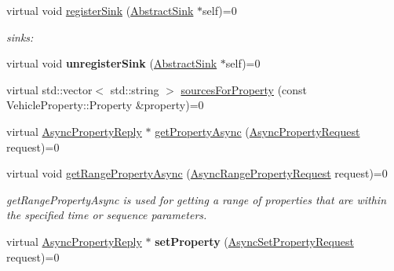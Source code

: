 \begin{DoxyCompactItemize}
\item 
\hypertarget{classAbstractRoutingEngine_a179052d9ab3f70ddb4c91421f94c45a9}{virtual void \hyperlink{classAbstractRoutingEngine_a179052d9ab3f70ddb4c91421f94c45a9}{register\+Sink} (\hyperlink{classAbstractSink}{Abstract\+Sink} $\ast$self)=0}\label{classAbstractRoutingEngine_a179052d9ab3f70ddb4c91421f94c45a9}

\begin{DoxyCompactList}\small\item\em sinks\+: \end{DoxyCompactList}\item 
\hypertarget{classAbstractRoutingEngine_a0f0a96c938c395565d01e0f78cc3bea8}{virtual void {\bfseries unregister\+Sink} (\hyperlink{classAbstractSink}{Abstract\+Sink} $\ast$self)=0}\label{classAbstractRoutingEngine_a0f0a96c938c395565d01e0f78cc3bea8}

\item 
virtual std\+::vector$<$ std\+::string $>$ \hyperlink{classAbstractRoutingEngine_aef8ad3a6c8d00d7fe9fdb378acf918c0}{sources\+For\+Property} (const Vehicle\+Property\+::\+Property \&property)=0
\item 
virtual \hyperlink{classAsyncPropertyReply}{Async\+Property\+Reply} $\ast$ \hyperlink{classAbstractRoutingEngine_ad1cbda415f674be4a3ce49be05aa8ee8}{get\+Property\+Async} (\hyperlink{classAsyncPropertyRequest}{Async\+Property\+Request} request)=0
\item 
virtual void \hyperlink{classAbstractRoutingEngine_a9befec62882b5cbf956b75dc99eedf21}{get\+Range\+Property\+Async} (\hyperlink{classAsyncRangePropertyRequest}{Async\+Range\+Property\+Request} request)=0
\begin{DoxyCompactList}\small\item\em get\+Range\+Property\+Async is used for getting a range of properties that are within the specified time or sequence parameters. \end{DoxyCompactList}\item 
\hypertarget{classAbstractRoutingEngine_a740b2c9bd8f842499cf250f660553651}{virtual \hyperlink{classAsyncPropertyReply}{Async\+Property\+Reply} $\ast$ {\bfseries set\+Property} (\hyperlink{classAsyncSetPropertyRequest}{Async\+Set\+Property\+Request} request)=0}\label{classAbstractRoutingEngine_a740b2c9bd8f842499cf250f660553651}


\end{DoxyCompactItemize}
